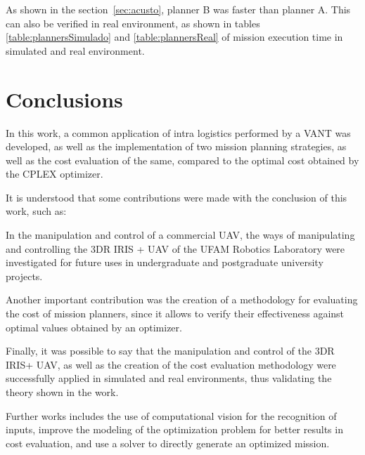 \documentclass[conference,harvard,brazil,english]{sbatex}
\begin{document}
	As shown in the section~\ref{sec:acusto}, planner B was faster than planner A. This can also be verified in real environment, as shown in tables \ref{table:plannersSimulado} and \ref{table:plannersReal} of mission execution time in simulated and real environment.

\section{Conclusions}
\label{sec:conclusao}

In this work, a common application of intra logistics performed by a VANT was developed, as well as the implementation of two mission planning strategies, as well as the cost evaluation of the same, compared to the optimal cost obtained by the CPLEX optimizer.

It is understood that some contributions were made with the conclusion of this work, such as:

In the manipulation and control of a commercial UAV, the ways of manipulating and controlling the 3DR IRIS + UAV of the UFAM Robotics Laboratory were investigated for future uses in undergraduate and postgraduate university projects.


Another important contribution was the creation of a methodology for evaluating the cost of mission planners, since it allows to verify their effectiveness against optimal values obtained by an optimizer.

Finally, it was possible to say that the manipulation and control of the 3DR IRIS+ UAV, as well as the creation of the cost evaluation methodology were successfully applied in simulated and real environments, thus validating the theory shown in the work.

Further works includes the use of computational vision for the recognition of inputs, improve the modeling of the optimization problem for better results in cost evaluation, and use a solver to directly generate an optimized mission.
\end{document}
